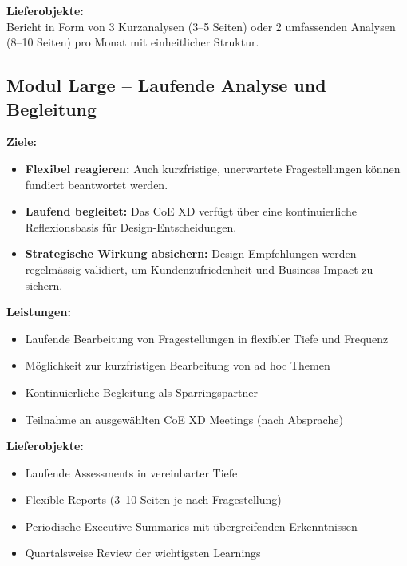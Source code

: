 \documentclass{fehradvice-report}
\begin{document}
\textbf{Lieferobjekte:}\\
Bericht in Form von 3 Kurzanalysen (3--5 Seiten) oder 2 umfassenden Analysen (8--10 Seiten) pro Monat mit einheitlicher Struktur.

\vspace{0.3cm}
\begin{center}
\end{center}

\vspace{1cm}
\subsection{Modul Large -- Laufende Analyse und Begleitung}

\textbf{Ziele:}
\begin{itemize}
    \item[$\checkmark$] \textbf{Flexibel reagieren:} Auch kurzfristige, unerwartete Fragestellungen können fundiert beantwortet werden.
    \item[$\checkmark$] \textbf{Laufend begleitet:} Das CoE XD verfügt über eine kontinuierliche Reflexionsbasis für Design-Entscheidungen.
    \item[$\checkmark$] \textbf{Strategische Wirkung absichern:} Design-Empfehlungen werden regelmässig validiert, um Kundenzufriedenheit und Business Impact zu sichern.
\end{itemize}

\textbf{Leistungen:}
\begin{itemize}
    \item Laufende Bearbeitung von Fragestellungen in flexibler Tiefe und Frequenz
    \item Möglichkeit zur kurzfristigen Bearbeitung von ad hoc Themen
    \item Kontinuierliche Begleitung als Sparringspartner
    \item Teilnahme an ausgewählten CoE XD Meetings (nach Absprache)
\end{itemize}

\textbf{Lieferobjekte:}
\begin{itemize}
    \item Laufende Assessments in vereinbarter Tiefe
    \item Flexible Reports (3--10 Seiten je nach Fragestellung)
    \item Periodische Executive Summaries mit übergreifenden Erkenntnissen
    \item Quartalsweise Review der wichtigsten Learnings
\end{itemize}
\end{document}

